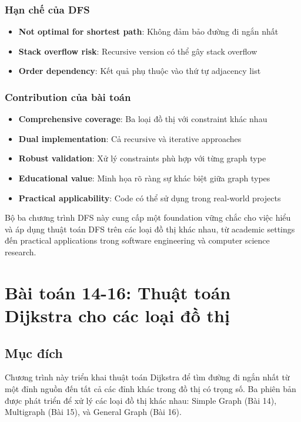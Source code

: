 \documentclass[12pt]{article}
\begin{document}
\subsubsection*{Hạn chế của DFS}
\begin{itemize}
    \item \textbf{Not optimal for shortest path}: Không đảm bảo đường đi ngắn nhất
    \item \textbf{Stack overflow risk}: Recursive version có thể gây stack overflow
    \item \textbf{Order dependency}: Kết quả phụ thuộc vào thứ tự adjacency list
\end{itemize}

\subsubsection*{Contribution của bài toán}
\begin{itemize}
    \item \textbf{Comprehensive coverage}: Ba loại đồ thị với constraint khác nhau
    \item \textbf{Dual implementation}: Cả recursive và iterative approaches
    \item \textbf{Robust validation}: Xử lý constraints phù hợp với từng graph type
    \item \textbf{Educational value}: Minh họa rõ ràng sự khác biệt giữa graph types
    \item \textbf{Practical applicability}: Code có thể sử dụng trong real-world projects
\end{itemize}

Bộ ba chương trình DFS này cung cấp một foundation vững chắc cho việc hiểu và áp dụng thuật toán DFS trên các loại đồ thị khác nhau, từ academic settings đến practical applications trong software engineering và computer science research.



\section*{Bài toán 14-16: Thuật toán Dijkstra cho các loại đồ thị}

\subsection*{Mục đích}
Chương trình này triển khai thuật toán Dijkstra để tìm đường đi ngắn nhất từ một đỉnh nguồn đến tất cả các đỉnh khác trong đồ thị có trọng số. Ba phiên bản được phát triển để xử lý các loại đồ thị khác nhau: Simple Graph (Bài 14), Multigraph (Bài 15), và General Graph (Bài 16).
\end{document}
